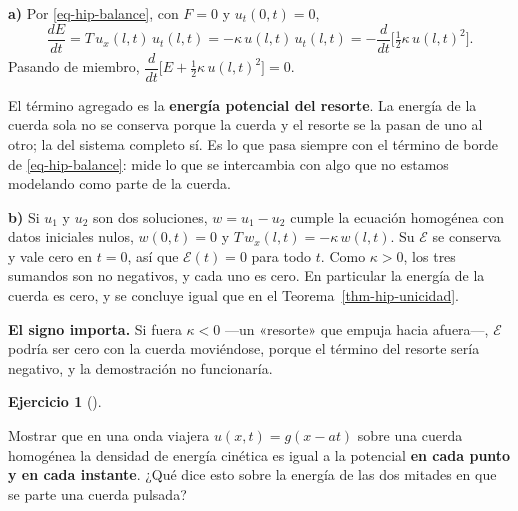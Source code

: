 \documentclass[
  spanish,
  a4paper,
]{scrbook}
\theoremstyle{definition}
\theoremstyle{plain}
\theoremstyle{definition}
\theoremstyle{plain}
\theoremstyle{definition}
\newtheorem{exercise}{Ejercicio}[chapter]
\theoremstyle{remark}
\begin{document}
\begin{tcolorbox}[enhanced jigsaw, arc=.35mm, bottomrule=.15mm, bottomtitle=1mm, breakable, colback=white, colbacktitle=quarto-callout-tip-color!10!white, colframe=quarto-callout-tip-color-frame, coltitle=black, left=2mm, leftrule=.75mm, opacityback=0, opacitybacktitle=0.6, rightrule=.15mm, title=\textcolor{quarto-callout-tip-color}{\faLightbulb}\hspace{0.5em}{Solución}, titlerule=0mm, toprule=.15mm, toptitle=1mm]

\textbf{a)} Por \ref{eq-hip-balance}, con \(F = 0\) y \(u_t(0,t) = 0\),
\[
\frac{dE}{dt} = T\,u_x(l,t)\,u_t(l,t) = -\kappa\,u(l,t)\,u_t(l,t) = -\frac{d}{dt}\Big[\tfrac12\kappa\,u(l,t)^2\Big].
\] Pasando de miembro,
\(\dfrac{d}{dt}\Big[E + \tfrac12\kappa\,u(l,t)^2\Big] = 0\).

El término agregado es la \textbf{energía potencial del resorte}. La
energía de la cuerda sola no se conserva porque la cuerda y el resorte
se la pasan de uno al otro; la del sistema completo sí. Es lo que pasa
siempre con el término de borde de \ref{eq-hip-balance}: mide lo que se
intercambia con algo que no estamos modelando como parte de la cuerda.

\textbf{b)} Si \(u_1\) y \(u_2\) son dos soluciones, \(w = u_1 - u_2\)
cumple la ecuación homogénea con datos iniciales nulos, \(w(0,t) = 0\) y
\(T\,w_x(l,t) = -\kappa\,w(l,t)\). Su \(\mathcal E\) se conserva y vale
cero en \(t=0\), así que \(\mathcal E(t) = 0\) para todo \(t\). Como
\(\kappa > 0\), los tres sumandos son no negativos, y cada uno es cero.
En particular la energía de la cuerda es cero, y se concluye igual que
en el Teorema~\ref{thm-hip-unicidad}.

\textbf{El signo importa.} Si fuera \(\kappa<0\) ---un «resorte» que
empuja hacia afuera---, \(\mathcal E\) podría ser cero con la cuerda
moviéndose, porque el término del resorte sería negativo, y la
demostración no funcionaría.

\end{tcolorbox}

\begin{exercise}[]\protect\hypertarget{exr-hip-equiparticion}{}\label{exr-hip-equiparticion}

Mostrar que en una onda viajera \(u(x,t) = g(x-at)\) sobre una cuerda
homogénea la densidad de energía cinética es igual a la potencial
\textbf{en cada punto y en cada instante}. ¿Qué dice esto sobre la
energía de las dos mitades en que se parte una cuerda pulsada?

\end{exercise}
\end{document}
